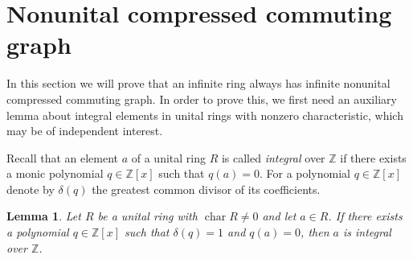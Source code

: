 \documentclass[12pt,a4paper]{amsart}
\newtheorem{lemma}[proposition]{Lemma}
\theoremstyle{definition}
\newcommand{\Z}{\mathbb{Z}}
\DeclareMathOperator{\ch}{char}
\begin{document}
\section{Nonunital compressed commuting graph}\label{sec:nonunital}

In this section we will prove that an infinite ring always has infinite nonunital compressed commuting graph. In order to prove this, we first need an auxiliary lemma about integral elements in unital rings with nonzero characteristic, which may be of independent interest. 

Recall that an element $a$ of a unital ring $R$ is called \emph{integral} over $\Z$ if there exists a monic polynomial $q \in \Z[x]$ such that $q(a)=0$.
For a polynomial $q \in \Z[x]$ denote by $\delta(q)$ the greatest common divisor of its coefficients.

\begin{lemma}\label{lem:integral}
    Let $R$ be a unital ring with $\ch R \ne 0$ and let $a \in R$. If there exists a polynomial $q\in \Z[x]$ such that $\delta(q)=1$ and $q(a)=0$, then $a$ is integral over $\Z$.
\end{lemma}
\end{document}

